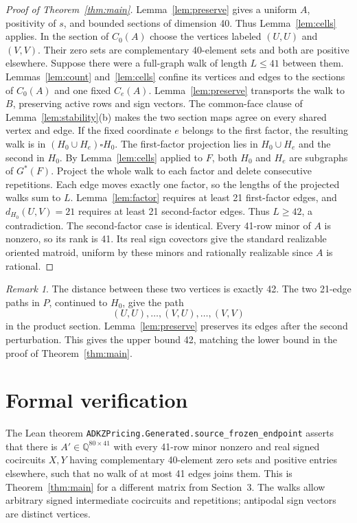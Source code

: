 \documentclass[11pt]{article}
\theoremstyle{remark}
\newtheorem{remark}[theorem]{Remark}
\newcommand{\Q}{\mathbb Q}
\begin{document}
\begin{proof}[Proof of Theorem~\ref{thm:main}]
Lemma~\ref{lem:preserve} gives a uniform $A$, positivity of $s$, and
bounded sections of dimension 40. Thus Lemma~\ref{lem:cells} applies.
In the section of $C_0(A)$ choose the vertices labeled $(U,U)$ and
$(V,V)$. Their zero sets are complementary 40-element sets and
both are positive elsewhere. Suppose
there were a full-graph walk of length $L\le41$ between them.
Lemmas~\ref{lem:count} and~\ref{lem:cells} confine its vertices and edges
to the sections of $C_0(A)$ and one fixed $C_e(A)$.
Lemma~\ref{lem:preserve} transports the walk to $B$, preserving active
rows and sign vectors. The common-face clause of
Lemma~\ref{lem:stability}(b) makes the two section maps agree on every
shared vertex and edge.
If the fixed coordinate $e$ belongs to the first factor,
the resulting walk is in $(H_0\cup H_e)\square H_0$.
The first-factor projection lies in $H_0\cup H_e$ and the second in
$H_0$. By Lemma~\ref{lem:cells} applied to $F$, both $H_0$ and $H_e$
are subgraphs of $G^*(F)$.
Project the whole walk to each factor and delete consecutive repetitions. Each
edge moves exactly one factor, so the lengths of the projected walks
sum to $L$. Lemma~\ref{lem:factor}
requires at least 21 first-factor edges, and
$d_{H_0}(U,V)=21$ requires at least 21 second-factor edges. Thus $L\ge42$, a contradiction. The second-factor case is identical.
Every 41-row minor of $A$ is nonzero, so its rank is 41. Its real sign
covectors give the standard realizable oriented matroid, uniform by these
minors and rationally realizable since $A$ is rational.
\end{proof}

\begin{remark}\label{rem:path}
The distance between these two vertices is exactly 42. The two
21-edge paths in $P$, continued to $H_0$, give the path
\[
 (U,U),\ldots,(V,U),\ldots,(V,V)
\]
in the product section. Lemma~\ref{lem:preserve} preserves its edges
after the second perturbation. This gives the upper bound 42, matching
the lower bound in the proof of Theorem~\ref{thm:main}.
\end{remark}





\section{Formal verification}

The Lean theorem
\nolinkurl{ADKZPricing.Generated.source_frozen_endpoint}
asserts that there is
$A'\in\Q^{80\times41}$ with every 41-row minor nonzero and real signed
cocircuits $X,Y$ having complementary 40-element zero sets and positive
entries elsewhere, such that no walk of at most 41 edges joins them.
This is Theorem~\ref{thm:main} for a different matrix from Section~3.
The walks allow arbitrary signed intermediate cocircuits and repetitions;
antipodal sign vectors are distinct vertices.
\end{document}
